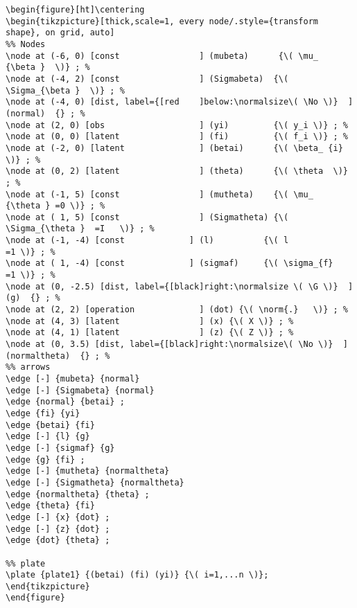 \documentclass[a4paper]{article}
\begin{document}
\lstset{numbers=left,language=[LaTeX]TeX,label= ,caption= ,captionpos=b}
\begin{lstlisting}
\begin{figure}[ht]\centering
\begin{tikzpicture}[thick,scale=1, every node/.style={transform shape}, on grid, auto]
%% Nodes
\node at (-6, 0) [const                ] (mubeta)      {\( \mu_   {\beta }  \)} ; %
\node at (-4, 2) [const                ] (Sigmabeta)  {\( \Sigma_{\beta }  \)} ; %
\node at (-4, 0) [dist, label={[red    ]below:\normalsize\( \No \)}  ] (normal)  {} ; %
\node at (2, 0) [obs                   ] (yi)         {\( y_i \)} ; %
\node at (0, 0) [latent                ] (fi)         {\( f_i \)} ; %
\node at (-2, 0) [latent               ] (betai)      {\( \beta_ {i}  \)} ; %
\node at (0, 2) [latent                ] (theta)      {\( \theta  \)} ; %
\node at (-1, 5) [const                ] (mutheta)    {\( \mu_   {\theta } =0 \)} ; %
\node at ( 1, 5) [const                ] (Sigmatheta) {\( \Sigma_{\theta }	=I   \)} ; %
\node at (-1, -4) [const             ] (l)          {\( l				=1 \)} ; %
\node at ( 1, -4) [const             ] (sigmaf)     {\( \sigma_{f}		=1 \)} ; %
\node at (0, -2.5) [dist, label={[black]right:\normalsize \( \G \)}  ] (g)  {} ; % 
\node at (2, 2) [operation             ] (dot) {\( \norm{.}   \)} ; %
\node at (4, 3) [latent                ] (x) {\( X \)} ; %
\node at (4, 1) [latent                ] (z) {\( Z \)} ; %
\node at (0, 3.5) [dist, label={[black]right:\normalsize\( \No \)}  ] (normaltheta)  {} ; % 
%% arrows
\edge [-] {mubeta} {normal}
\edge [-] {Sigmabeta} {normal}
\edge {normal} {betai} ;
\edge {fi} {yi}
\edge {betai} {fi}
\edge [-] {l} {g}
\edge [-] {sigmaf} {g}
\edge {g} {fi} ;
\edge [-] {mutheta} {normaltheta}
\edge [-] {Sigmatheta} {normaltheta}
\edge {normaltheta} {theta} ;
\edge {theta} {fi}
\edge [-] {x} {dot} ;
\edge [-] {z} {dot} ;
\edge {dot} {theta} ;

%% plate
\plate {plate1} {(betai) (fi) (yi)} {\( i=1,...n \)}; 
\end{tikzpicture}
\end{figure}
\end{lstlisting}
\end{document}
